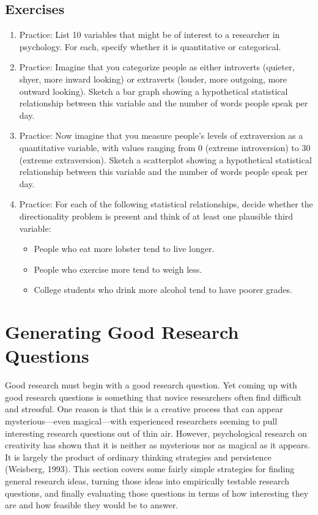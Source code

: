\documentclass[]{book}
\theoremstyle{definition}
\theoremstyle{definition}
\theoremstyle{remark}
\begin{document}
\subsection{Exercises}\label{exercises-4}

\begin{enumerate}
\def\labelenumi{\arabic{enumi}.}
\item
  Practice: List 10 variables that might be of interest to a researcher
  in psychology. For each, specify whether it is quantitative or
  categorical.
\item
  Practice: Imagine that you categorize people as either introverts
  (quieter, shyer, more inward looking) or extraverts (louder, more
  outgoing, more outward looking). Sketch a bar graph showing a
  hypothetical statistical relationship between this variable and the
  number of words people speak per day.
\item
  Practice: Now imagine that you measure people's levels of extraversion
  as a quantitative variable, with values ranging from 0 (extreme
  introversion) to 30 (extreme extraversion). Sketch a scatterplot
  showing a hypothetical statistical relationship between this variable
  and the number of words people speak per day.
\item
  Practice: For each of the following statistical relationships, decide
  whether the directionality problem is present and think of at least
  one plausible third variable:

  \begin{itemize}
  \item
    People who eat more lobster tend to live longer.
  \item
    People who exercise more tend to weigh less.
  \item
    College students who drink more alcohol tend to have poorer grades.
  \end{itemize}
\end{enumerate}

\section{Generating Good Research
Questions}\label{generating-good-research-questions}

Good research must begin with a good research question. Yet coming up
with good research questions is something that novice researchers often
find difficult and stressful. One reason is that this is a creative
process that can appear mysterious---even magical---with experienced
researchers seeming to pull interesting research questions out of thin
air. However, psychological research on creativity has shown that it is
neither as mysterious nor as magical as it appears. It is largely the
product of ordinary thinking strategies and persistence (Weisberg,
1993). This section covers some fairly simple strategies for finding
general research ideas, turning those ideas into empirically testable
research questions, and finally evaluating those questions in terms of
how interesting they are and how feasible they would be to answer.
\end{document}
